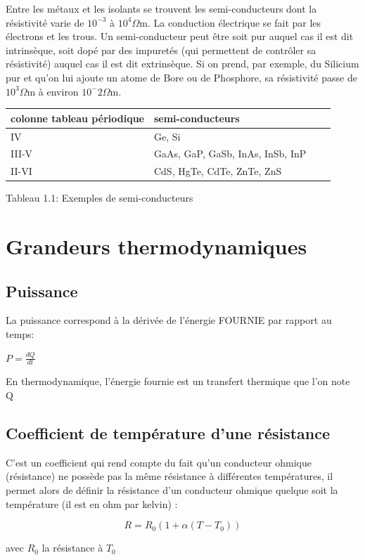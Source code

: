 \documentclass[10pt,a4paper]{report}
\begin{document}
Entre  les  métaux  et  les  isolants  se  trouvent  les  semi-conducteurs  dont  la  résistivité
varie de $10^{-3}$ à $10^4 \Omega$m. La conduction électrique se fait par les électrons et les trous. Un semi-conducteur peut être soit pur auquel cas il est dit intrinsèque, soit dopé par des impuretés (qui permettent de contrôler sa résistivité) auquel cas il est dit extrinsèque. Si on prend, par exemple, du Silicium pur  et  qu’on  lui  ajoute  un  atome  de  Bore  ou  de Phosphore,  sa résistivité passe de$ 10^3 \Omega$m à environ $10^-2 \Omega$m.
\newline
\begin{center}
\begin{tabular}{|l|p{3cm}|c|p{3cm}|}\hline
colonne tableau périodique & semi-conducteurs\\\hline
IV & Ge, Si\\\hline
III-V & GaAs, GaP, GaSb, InAs, InSb, InP\\\hline
II-VI & CdS, HgTe, CdTe, ZnTe, ZnS \\\hline
\end{tabular}
\end{center}
\begin{center}
Tableau 1.1: Exemples de semi-conducteurs
\end{center}
\section{Grandeurs thermodynamiques}
\subsection{Puissance}
La puissance correspond à la dérivée de l'énergie FOURNIE par rapport au temps:
\newline
\begin{center}
{$P=\frac{dQ}{dt}$}
\end{center}
En thermodynamique, l’énergie fournie est un transfert thermique que l'on note Q
\subsection{Coefficient de température d'une résistance}
 C’est un coefficient qui rend compte du fait qu’un conducteur ohmique (résistance) ne possède pas la même résistance à différentes températures, il permet alors de définir la résistance d’un conducteur ohmique quelque soit la température (il est en ohm par kelvin) :
\newline
\begin{center}
\begin{equation}
R=R_{0}(1+\alpha(T-T_{0}))
\end{equation}
\end{center}
\begin{center}
avec $R_{0}$ la résistance à $T_{0}$
\end{center}
\end{document}

